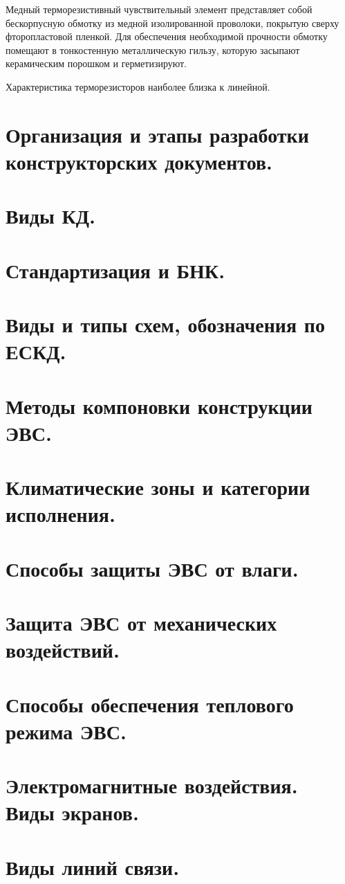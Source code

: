 \documentclass[unicode, 12pt, a4paper, oneside]{article}
\begin{document}
Медный терморезистивный чувствительный элемент представляет собой бескорпусную обмотку из медной изолированной проволоки, покрытую сверху фторопластовой пленкой. Для обеспечения необходимой прочности обмотку помещают в тонкостенную металлическую гильзу, которую засыпают керамическим порошком и герметизируют.

Характеристика терморезисторов наиболее близка к линейной.

\section{Организация и этапы разработки конструкторских документов.}
\section{Виды КД.}
\section{Стандартизация и БНК.}
\section{Виды и типы схем, обозначения по ЕСКД.}
\section{Методы компоновки конструкции ЭВС.}
\section{Климатические зоны и категории исполнения.}
\section{Способы защиты ЭВС от влаги.}
\section{Защита ЭВС от механических воздействий.}
\section{Способы обеспечения теплового режима ЭВС.}
\section{Электромагнитные воздействия. Виды экранов.}
\section{Виды линий связи.}
\end{document}
